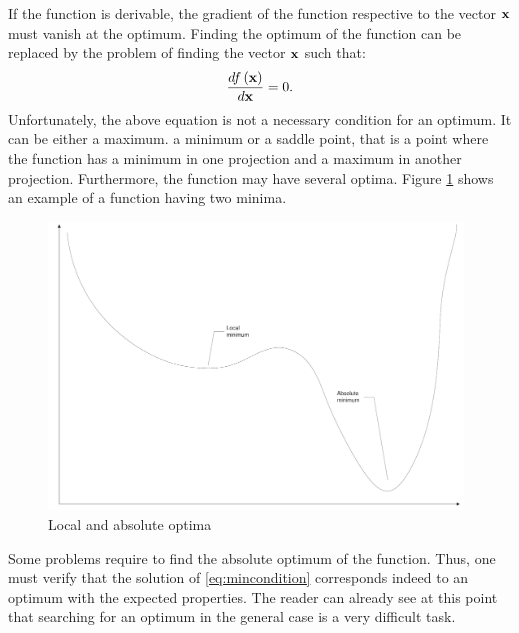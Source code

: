 \documentclass[twoside]{book}
\begin{document}
If the function is derivable, the gradient of the function
respective to the vector ${\bf x}$ must vanish at the optimum.
Finding the optimum of the function can be replaced by the problem
of finding the vector ${\bf x}$ such that:
\begin{equation}
\label{eq:mincondition}
  {d f\left({\bf x}\right) \over d{\bf x}} = 0.
\end{equation}
Unfortunately, the above equation is not a necessary condition for
an optimum. It can be either a maximum. a minimum or a saddle
point, that is a point where the function has a minimum in one
projection and a maximum in another projection. Furthermore, the
function may have several optima. Figure \ref{fig:localabsobulte}
shows an example of a function having two minima.
\begin{figure}
\centering\includegraphics[width=11cm]{Figures/MinimumAbsLoc}
\caption{Local and absolute optima} \label{fig:localabsobulte}
\end{figure}
Some problems require to find the absolute optimum of the
function. Thus, one must verify that the solution of
\ref{eq:mincondition} corresponds indeed to an optimum with the
expected properties. The reader can already see at this point that
searching for an optimum in the general case is a very difficult
task.
\end{document}
